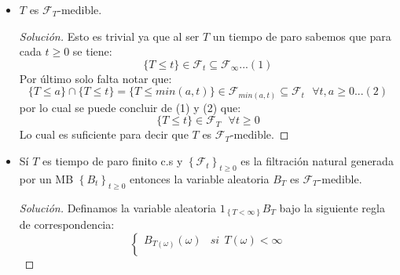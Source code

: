 \documentclass[11pt,notitlepage]{article}
\newenvironment{solucion}
  {\begin{proof}[Solución]}
  {\end{proof}}
\begin{document}
\begin{itemize}
\begin{enumerate}
            \begin{solucion}
            Una vez más notemos que al ser \(\mathcal{F}_{\infty}\) una \(\sigma\)-álgebra, se deberia de tener que si \(\{A_n\}_{n \in \mathbb{N}} \subseteq  \mathcal{F}_{\infty}\) entonces \(\bigcup_{n \in \mathbb{N}}A_n \in \mathcal{F}_{\infty}\), por lo que solo resta probar que: 
             \[\left \{ \bigcup_{n \in \mathbb{N}}A_n \right \}\cap\{T \leq t\} \in \mathcal{F}_t \ \ \ \forall t \geq 0\]
             Lo cual es bastante sencillo ya que para cada \(t \geq 0\) y para cada \(n \in \mathbb{N}\) se debería tener que:
             \[A_n\cap\{T \leq t\} \in \mathcal{F}_{t}\]
             Pero al ser \(\mathcal{F}_{t}\) una \(\sigma\)-álgebra para cada \(t \geq 0\), esto último implica que:
             \[\left \{ \bigcup_{n \in \mathbb{N}}A_n \right \}\cap\{T \leq t\} = \left \{ \bigcup_{n \in \mathbb{N}} A_n\cap\{T \leq t\}\right \}  \cap\{T \leq t\} \in \mathcal{F}_{t}\]
             Esto último implica que: 
             \[\bigcup_{n \in \mathbb{N}}A_n \in \mathcal{F}_{T}\]
            \end{solucion}
    \end{enumerate}
    \item \(T\) es \(\mathcal{F}_{T}\)-medible.
           \begin{solucion}
           Esto es trivial ya que al ser \(T\) un tiempo de paro sabemos que para cada \(t \geq 0\) se tiene: 
           \[\{T \leq t\}\in \mathcal{F}_t \subseteq \mathcal{F}_{\infty}...(1)\] 
           Por último solo falta notar que: 
           \[\{T \leq a\}\cap\{T \leq t\}=\{T \leq min(a,t)\} \in \mathcal{F}_{min(a,t)} \subseteq \mathcal{F}_{t}\ \ \  \forall t,a \geq 0 ... (2)\]
          por lo cual se puede concluir de (1) y (2) que:
          \[\{T \leq t\} \in \mathcal{F}_T \ \ \  \forall t \geq 0\]
          Lo cual es suficiente para decir que \(T\) es \(\mathcal{F}_{T}\)-medible. 
           \end{solucion}
    \item Sí \(T\) es tiempo de paro finito c.s y \(\left \{ \mathcal{F}_{t} \right \}_{t\geq 0}\) es la filtración natural generada por un MB \(\left \{ B_{t} \right \}_{t\geq 0}\) entonces la variable aleatoria \(B_{T}\) es \(\mathcal{F}_{T}\)-medible.
    \begin{solucion}
      Definamos la variable aleatoria \(\mathrm{1}_{\left\{T < \infty\right\}}B_T\) bajo la siguiente regla de correspondencia: 
      \[
      \left\{\begin{matrix}
      B_{T(\omega)}(\omega)  & si \ \ T(\omega) < \infty\\ 

\end{matrix}\]
\end{solucion}
\end{itemize}
\end{document}
